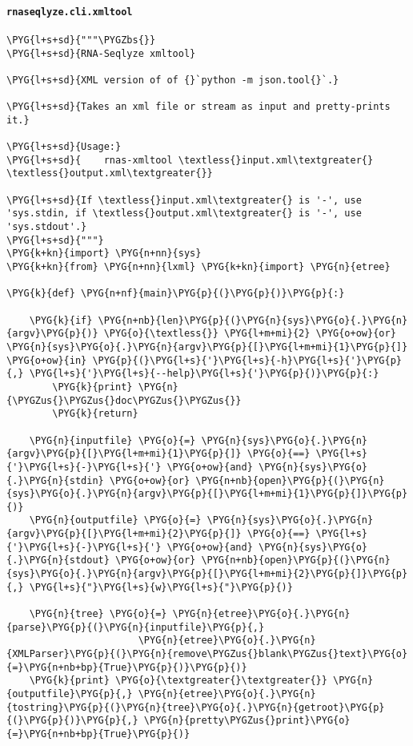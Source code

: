 \paragraph{\texttt{rnaseqlyze.cli.xmltool}}
\label{index-pdf4:rnaseqlyze-cli-xmltool}
\begin{Verbatim}[commandchars=\\\{\}]
\PYG{l+s+sd}{"""\PYGZbs{}}
\PYG{l+s+sd}{RNA-Seqlyze xmltool}

\PYG{l+s+sd}{XML version of of {}`python -m json.tool{}`.}

\PYG{l+s+sd}{Takes an xml file or stream as input and pretty-prints it.}

\PYG{l+s+sd}{Usage:}
\PYG{l+s+sd}{    rnas-xmltool \textless{}input.xml\textgreater{} \textless{}output.xml\textgreater{}}

\PYG{l+s+sd}{If \textless{}input.xml\textgreater{} is '-', use 'sys.stdin, if \textless{}output.xml\textgreater{} is '-', use 'sys.stdout'.}
\PYG{l+s+sd}{"""}
\PYG{k+kn}{import} \PYG{n+nn}{sys}
\PYG{k+kn}{from} \PYG{n+nn}{lxml} \PYG{k+kn}{import} \PYG{n}{etree}

\PYG{k}{def} \PYG{n+nf}{main}\PYG{p}{(}\PYG{p}{)}\PYG{p}{:}

    \PYG{k}{if} \PYG{n+nb}{len}\PYG{p}{(}\PYG{n}{sys}\PYG{o}{.}\PYG{n}{argv}\PYG{p}{)} \PYG{o}{\textless{}} \PYG{l+m+mi}{2} \PYG{o+ow}{or} \PYG{n}{sys}\PYG{o}{.}\PYG{n}{argv}\PYG{p}{[}\PYG{l+m+mi}{1}\PYG{p}{]} \PYG{o+ow}{in} \PYG{p}{(}\PYG{l+s}{'}\PYG{l+s}{-h}\PYG{l+s}{'}\PYG{p}{,} \PYG{l+s}{'}\PYG{l+s}{--help}\PYG{l+s}{'}\PYG{p}{)}\PYG{p}{:}
        \PYG{k}{print} \PYG{n}{\PYGZus{}\PYGZus{}doc\PYGZus{}\PYGZus{}}
        \PYG{k}{return}

    \PYG{n}{inputfile} \PYG{o}{=} \PYG{n}{sys}\PYG{o}{.}\PYG{n}{argv}\PYG{p}{[}\PYG{l+m+mi}{1}\PYG{p}{]} \PYG{o}{==} \PYG{l+s}{'}\PYG{l+s}{-}\PYG{l+s}{'} \PYG{o+ow}{and} \PYG{n}{sys}\PYG{o}{.}\PYG{n}{stdin} \PYG{o+ow}{or} \PYG{n+nb}{open}\PYG{p}{(}\PYG{n}{sys}\PYG{o}{.}\PYG{n}{argv}\PYG{p}{[}\PYG{l+m+mi}{1}\PYG{p}{]}\PYG{p}{)}
    \PYG{n}{outputfile} \PYG{o}{=} \PYG{n}{sys}\PYG{o}{.}\PYG{n}{argv}\PYG{p}{[}\PYG{l+m+mi}{2}\PYG{p}{]} \PYG{o}{==} \PYG{l+s}{'}\PYG{l+s}{-}\PYG{l+s}{'} \PYG{o+ow}{and} \PYG{n}{sys}\PYG{o}{.}\PYG{n}{stdout} \PYG{o+ow}{or} \PYG{n+nb}{open}\PYG{p}{(}\PYG{n}{sys}\PYG{o}{.}\PYG{n}{argv}\PYG{p}{[}\PYG{l+m+mi}{2}\PYG{p}{]}\PYG{p}{,} \PYG{l+s}{"}\PYG{l+s}{w}\PYG{l+s}{"}\PYG{p}{)}

    \PYG{n}{tree} \PYG{o}{=} \PYG{n}{etree}\PYG{o}{.}\PYG{n}{parse}\PYG{p}{(}\PYG{n}{inputfile}\PYG{p}{,}
                       \PYG{n}{etree}\PYG{o}{.}\PYG{n}{XMLParser}\PYG{p}{(}\PYG{n}{remove\PYGZus{}blank\PYGZus{}text}\PYG{o}{=}\PYG{n+nb+bp}{True}\PYG{p}{)}\PYG{p}{)}
    \PYG{k}{print} \PYG{o}{\textgreater{}\textgreater{}} \PYG{n}{outputfile}\PYG{p}{,} \PYG{n}{etree}\PYG{o}{.}\PYG{n}{tostring}\PYG{p}{(}\PYG{n}{tree}\PYG{o}{.}\PYG{n}{getroot}\PYG{p}{(}\PYG{p}{)}\PYG{p}{,} \PYG{n}{pretty\PYGZus{}print}\PYG{o}{=}\PYG{n+nb+bp}{True}\PYG{p}{)}
\end{Verbatim}


